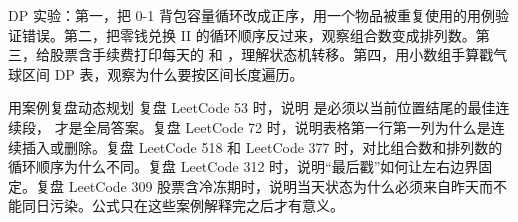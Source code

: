 \begin{labbox}
DP 实验：第一，把 0-1 背包容量循环改成正序，用一个物品被重复使用的用例验证错误。第二，把零钱兑换 II 的循环顺序反过来，观察组合数变成排列数。第三，给股票含手续费打印每天的  和 ，理解状态机转移。第四，用小数组手算戳气球区间 DP 表，观察为什么要按区间长度遍历。
\end{labbox}

\begin{principlebox}{用案例复盘动态规划}
复盘 LeetCode 53 时，说明  是必须以当前位置结尾的最佳连续段， 才是全局答案。复盘 LeetCode 72 时，说明表格第一行第一列为什么是连续插入或删除。复盘 LeetCode 518 和 LeetCode 377 时，对比组合数和排列数的循环顺序为什么不同。复盘 LeetCode 312 时，说明“最后戳”如何让左右边界固定。复盘 LeetCode 309 股票含冷冻期时，说明当天状态为什么必须来自昨天而不能同日污染。公式只在这些案例解释完之后才有意义。
\end{principlebox}





